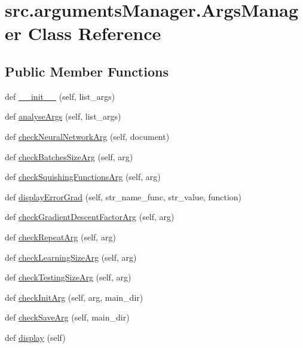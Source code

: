 \hypertarget{classsrc_1_1argumentsManager_1_1ArgsManager}{}\section{src.\+arguments\+Manager.\+Args\+Manager Class Reference}
\label{classsrc_1_1argumentsManager_1_1ArgsManager}
\subsection*{Public Member Functions}
\begin{DoxyCompactItemize}
\item 
def \hyperlink{classsrc_1_1argumentsManager_1_1ArgsManager_a56c287b105275a085f72d937077f0597}{\+\_\+\+\_\+init\+\_\+\+\_\+} (self, list\+\_\+args)
\item 
def \hyperlink{classsrc_1_1argumentsManager_1_1ArgsManager_a66d91bcecc3124c0d2fc599c9f34d4a6}{analyse\+Args} (self, list\+\_\+args)
\item 
def \hyperlink{classsrc_1_1argumentsManager_1_1ArgsManager_a2830d2111235710caa548a05d8e2b2a7}{check\+Neural\+Network\+Arg} (self, document)
\item 
def \hyperlink{classsrc_1_1argumentsManager_1_1ArgsManager_a7c1e007e645d84374b38a820d065f3b7}{check\+Batches\+Size\+Arg} (self, arg)
\item 
def \hyperlink{classsrc_1_1argumentsManager_1_1ArgsManager_a54b0cc173c824867e1d0e3c82c172587}{check\+Squishing\+Functions\+Arg} (self, arg)
\item 
def \hyperlink{classsrc_1_1argumentsManager_1_1ArgsManager_a4f02e08cd08c1c641e6c41498824c17e}{display\+Error\+Grad} (self, str\+\_\+name\+\_\+func, str\+\_\+value, function)
\item 
def \hyperlink{classsrc_1_1argumentsManager_1_1ArgsManager_a1cd264b32822ba293462eaebe65113fa}{check\+Gradient\+Descent\+Factor\+Arg} (self, arg)
\item 
def \hyperlink{classsrc_1_1argumentsManager_1_1ArgsManager_a30685b938e9002271a97b84e0c08abc3}{check\+Repeat\+Arg} (self, arg)
\item 
def \hyperlink{classsrc_1_1argumentsManager_1_1ArgsManager_ae582f8b031c9066b9caae807aaf53fe2}{check\+Learning\+Size\+Arg} (self, arg)
\item 
def \hyperlink{classsrc_1_1argumentsManager_1_1ArgsManager_a0e6ecee8ffdafb625fbdd3013737f5b8}{check\+Testing\+Size\+Arg} (self, arg)
\item 
def \hyperlink{classsrc_1_1argumentsManager_1_1ArgsManager_a6d44e451653a09e99d17fe516d5d03bb}{check\+Init\+Arg} (self, arg, main\+\_\+dir)
\item 
def \hyperlink{classsrc_1_1argumentsManager_1_1ArgsManager_a84a36367eeb6039ae3f6410532e4378f}{check\+Save\+Arg} (self, main\+\_\+dir)
\item 
def \hyperlink{classsrc_1_1argumentsManager_1_1ArgsManager_a5e5c60766831a69e08a99607dd465649}{display} (self)
\end{DoxyCompactItemize}
